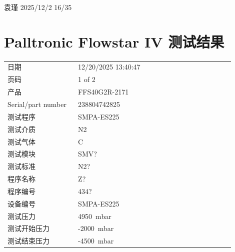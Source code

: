 \documentclass[UTF8,10pt,a4paper,fontset=fandol]{ctexart}
\newcommand{\fieldvalue}[1]{#1}
\newcommand{\handwritten}[1]{#1}
\begin{document}
\handwritten{袁瑾}
\qquad
\handwritten{2025/12/2}
\qquad
\handwritten{16/35}


\newpage

\section{Palltronic Flowstar IV 测试结果}

\begin{tabular}{@{}p{0.28\linewidth}p{0.62\linewidth}@{}}
日期 &
\fieldvalue{12/20/2025 13:40:47}
\\
页码 &
\fieldvalue{1 of 2}
\\
产品 &
\fieldvalue{FFS40G2R-2171}
\\
Serial/part number &
\fieldvalue{238804742825}
\\
测试程序 &
\fieldvalue{SMPA-ES225}
\\
测试介质 &
\fieldvalue{N2}
\\
测试气体 &
\fieldvalue{C}
\\
测试模块 &
\fieldvalue{SMV?}
\\
测试标准 &
\fieldvalue{N2?}
\\
程序名称 &
\fieldvalue{Z?}
\\
程序编号 &
\fieldvalue{434?}
\\
设备编号 &
\fieldvalue{SMPA-ES225}
\\
测试压力 &
\fieldvalue{4950\ mbar}
\\
测试开始压力 &
\fieldvalue{-2000\ mbar}
\\
测试结束压力 &
\fieldvalue{-4500\ mbar}
\\
\end{tabular}
\end{document}
